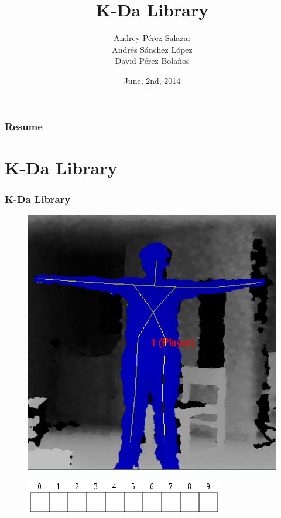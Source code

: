 \documentclass{beamer}
\title[K-Da Library]{K-Da Library} %
\author{Andrey Pérez Salazar\\ Andrés Sánchez López\\ David Pérez Bolaños} %
\institute[UCR] %
{
University of Costa Rica \\ %
\medskip
\textit{} %
}
\date{June, 2nd, 2014} %
\begin{document}
\begin{frame}
\titlepage %
\end{frame}

\begin{frame}
\frametitle{Resume} %
\tableofcontents %
\end{frame}


\section{K-Da Library } %


\begin{frame}
\frametitle{K-Da Library}

\begin{figure}
\includegraphics[width=0.3\linewidth]{11.png}
\end{figure}

\begin{figure}
\includegraphics[width=0.3\linewidth]{12.png}
\end{figure}

\end{frame}
\end{document}
